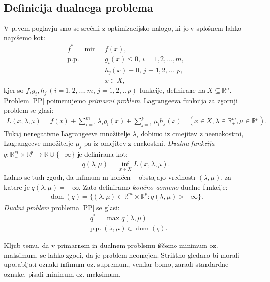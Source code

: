 \documentclass[mat1]{fmfdelo}
\newcommand{\R}{\mathbb R}
\DeclareMathOperator{\dom}{dom}
\begin{document}
\subsection{Definicija dualnega problema}
V prvem poglavju smo se srečali z optimizacijsko nalogo, ki jo v splošnem lahko napišemo kot:
\begin{align}
\label{PP}f^* =  \min~ &f(x),\\ 
\nonumber	\text{p.p. } &g_i(x) \le 0, ~ i = 1,2,\ldots,m, \\
\nonumber	&h_j(x) = 0, ~j = 1, 2, \ldots,p, \\
\nonumber	&x\in X,
\end{align}
kjer so $f, g_i, h_j ~(i=1,2,\ldots,m,~ j=1, 2,\ldots p)$ funkcije, definirane na $X \subseteq \R^n$. Problem \eqref{PP} poimenujemo \emph{primarni problem}. Lagrangeeva funkcija za zgornji problem se glasi: 
\begin{align*}
L(x, \lambda, \mu) = f(x)+ \sum_{i=1}^{m}\lambda_ig_i(x) + \sum_{j=1}^{p}\mu_ih_j(x)\quad (x \in X, \lambda \in \R_+^m, \mu \in \R^p).
\end{align*}
Tukaj nenegativne Lagrangeeve množitelje $\lambda_i$ dobimo iz omejitev z neenakostmi, Lagrangeeve množitelje $\mu_j$ pa iz omejitev z enakostmi. \emph{Dualna funkcija} $q: \R_+^m \times \R^p \to \R \cup \{-\infty\}$ je definirana kot:
\begin{align*}
q(\lambda, \mu) = \inf_{x \in X}L(x, \lambda, \mu).
\end{align*} 
Lahko se tudi zgodi, da infimum ni končen -- obstajajo vrednosti $(\lambda, \mu)$, za katere je $q(\lambda, \mu)= - \infty$. Zato definiramo \emph{končno domeno} dualne funkcije: 
\begin{align*}
\dom(q) = \{(\lambda, \mu) \in \R_+^m \times \R^p: q(\lambda, \mu) > - \infty\}.
\end{align*}
\emph{Dualni problem} problema \eqref{PP} se glasi: 
\begin{align}
\label{DP} &q^* = \max q(\lambda, \mu)\\ 
\nonumber &\text{p.p.} ~ (\lambda,\mu) \in \dom(q). 
\end{align}

\begin{opomba}
	Kljub temu, da v primarnem in dualnem problemu iščemo minimum oz. maksimum, se lahko zgodi, da je problem neomejen. Striktno gledano bi morali uporabljati oznaki infimum oz. supremum, vendar bomo, zaradi standardne oznake, pisali minimum oz. maksimum.
\end{opomba}
\end{document}
